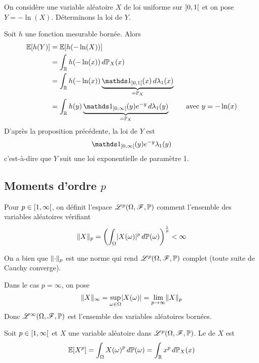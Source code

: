 \begin{exs}
    On considère une variable aléatoire \(X\) de loi uniforme sur \(\mathopen{}\left]0,1\right[\mathclose{}\)
    et on pose \(Y = -\ln(X)\). Déterminons la loi de \(Y\).

    Soit \(h\) une fonction mesurable bornée. Alors
    \begin{equation*}
        \begin{aligned}
            \bb E\ff{h(Y)} 
            &= \bb E\ff{h(-\ln(X))}\\
            &= \int_{\R} h(-\ln(x))\der\bb P_X(x)\\
            &= \int_{\R} h(-\ln(x)) \underbrace{\one_{\oo{0,1}}(x)\der\lambda_1(x)}_{=\bb P_X}\\
            &= \int_{\R} h(y) \underbrace{\one_{\oo{0,\infty}}(y) e^{-y}\der\lambda_1(y)}_{=\bb P_X}\qquad\text{ avec }y=-\ln(x)
        \end{aligned}
    \end{equation*}
    D'après la proposition précédente, la loi de \(Y\) est
    \begin{equation*}
        \one_{\oo{0,\infty}}(y)e^{-y}\lambda_1(y)
    \end{equation*}
    c'est-à-dire que \(Y\) suit une loi exponentielle de paramètre 1.
\end{exs}

\subsection{Moments d'ordre \(p\)} %

Pour \(p\in\mathopen{}\left[1,\infty\right[\mathclose{}\), on définit l'espace \(\mathscr{L}^p(\Omega, \mathscr{F}, \mathbb{P})\)
comment l'ensemble des variables aléatoires vérifiant
\begin{equation*}
    \mathopen{}\left\|X\right\|\mathclose{}_p = {\left(\int_{\Omega}\mathopen{}\left|X(\omega)\right|\mathclose{}^p\mathop{}\!{d}\mathbb{P}(\omega)\right)}^{\frac1p}<\infty
\end{equation*}

On a bien que \(\mathopen{}\left\|\cdot\right\|\mathclose{}_p\) est une norme qui rend \(\mathscr{L}^p(\Omega, \mathscr{F}, \mathbb{P})\) complet
(toute suite de Cauchy converge).

Dans le cas \(p=\infty\), on pose
\begin{equation*}
    \mathopen{}\left\|X\right\|\mathclose{}_\infty = \sup_{\omega\in\Omega}\mathopen{}\left|X(\omega)\right|\mathclose{}=\lim_{p\to\infty}\mathopen{}\left\|X\right\|\mathclose{}_p
\end{equation*}
Donc \(\mathscr{L}^\infty (\Omega,\mathscr{F},\mathbb{P})\) est l'ensemble des variables aléatoires bornées.

\begin{definition}
    Soit \(p\in\mathopen{}\left[1,\infty\right[\mathclose{}\) et \(X\) une variable aléatoire dans
    \(\mathscr{L}^p(\Omega, \mathscr{F}, \mathbb{P})\). Le  de
    \(X\) est
    \begin{equation*}
        \mathbb{E}\mathopen{}\left[X^p\right]\mathclose{} = \int_{\Omega} {X(\omega)}^p\mathop{}\!{d}\mathbb{P}(\omega) = \int_{\mathbb{R}}x^p\mathop{}\!{d}\mathbb{P}_X(x)
    \end{equation*}
\end{definition}

